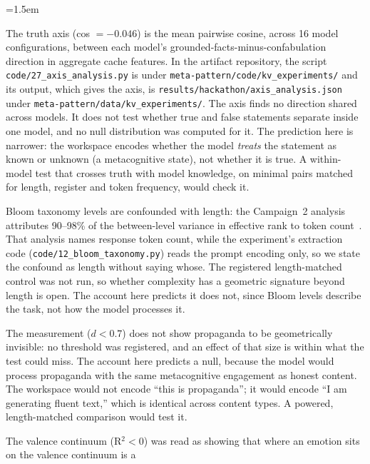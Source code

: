 \documentclass[11pt,a4paper]{article}
\begin{document}
\begin{description}[nosep]
\emergencystretch=1.5em %
\item[Truth value:] The truth axis (cos $= -0.046$) is the mean
  pairwise cosine, across 16 model configurations, between each
  model's grounded-facts-minus-confabulation direction in aggregate
  cache features. In the artifact repository, the script
  \nolinkurl{code/27_axis_analysis.py} is under
  \nolinkurl{meta-pattern/code/kv_experiments/} and its output, which
  gives the axis, is \nolinkurl{results/hackathon/axis_analysis.json}
  under \nolinkurl{meta-pattern/data/kv_experiments/}. The axis finds no
  direction shared across models. It does not test whether true and
  false statements separate inside one model, and no null distribution
  was computed for it. The
  prediction here is narrower: the workspace encodes whether the model
  \emph{treats} the statement as known or unknown (a metacognitive
  state), not whether it is true. A within-model test that crosses truth
  with model knowledge, on minimal pairs matched for length, register
  and token frequency, would check it.
\item[Complexity:] Bloom taxonomy levels are confounded with length:
  the Campaign~2 analysis attributes 90--98\% of the between-level
  variance in effective rank to token count~\citep{lyra2026campaign2}.
  That analysis names response token count, while the experiment's
  extraction code (\nolinkurl{code/12_bloom_taxonomy.py}) reads the
  prompt encoding only, so we state the confound as length without
  saying whose. The registered length-matched control was not run, so
  whether complexity has a geometric signature beyond length is open.
  The account here predicts it does not, since Bloom levels describe
  the task, not how the model processes it.
\item[Propaganda:] The measurement ($d{<}0.7$) does not show propaganda
  to be geometrically invisible: no threshold was registered, and an
  effect of that size is within what the test could miss. The account
  here predicts a null, because the model would process propaganda with
  the same metacognitive engagement as honest content. The workspace
  would not encode ``this is propaganda''; it would encode ``I am
  generating fluent text,'' which is identical across content types. A
  powered, length-matched comparison would test it.
\item[Emotion degree:] The valence continuum (R$^2 < 0$) was read as
  showing that where an emotion sits on the valence continuum is a

\end{description}
\end{document}
